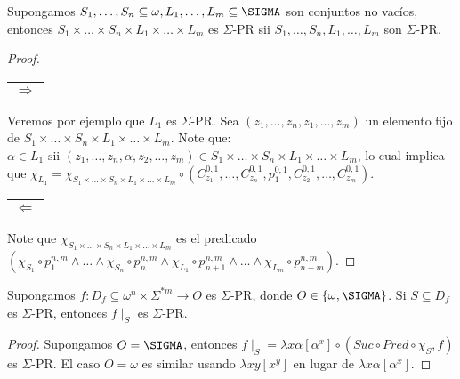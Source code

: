   \begin{lemma}
    \par Supongamos $S_{1}, \dotsc, S_{n} \subseteq \omega, L_{1}, \dotsc, L_{m} \subseteq \SIGMA$ son conjuntos no
    vacíos, entonces $S_{1} \times \dotsc \times S_{n} \times L_{1} \times \dotsc \times L_{m}$ es $\Sigma$-PR sii
    $S_{1}, \dotsc, S_{n}, L_{1}, \dotsc, L_{m}$ son $\Sigma$-PR.
  \end{lemma}
  \begin{proof}
    \begin{tabular}{|c|} \hline $\Rightarrow$\\\hline \end{tabular} Veremos por ejemplo que $L_{1}$ es $\Sigma$-PR. Sea
      $(z_{1}, \dotsc, z_{n}, z_{1}, \dotsc, z_{m})$ un elemento fijo de $S_{1} \times \dotsc \times S_{n}
      \times L_{1} \times \dotsc \times L_{m}$. Note que: $\alpha \in L_{1} \text{ sii } (z_{1}, \dotsc, z_{n}, \alpha,
      z_{2}, \dotsc, z_{m}) \in S_{1} \times \dotsc \times S_{n} \times L_{1} \times \dotsc \times L_{m}$,
      lo cual implica que $\chi_{L_{1}} = \chi_{S_{1} \times \dotsc \times S_{n} \times L_{1} \times \dotsc \times
      L_{m}} \circ (C_{z_{1}}^{0, 1}, \dotsc, C_{z_{n}}^{0, 1}, p_{1}^{0, 1}, C_{z_{2}}^{0, 1}, \dotsc,
      C_{z_{m}}^{0, 1})$.

    \begin{tabular}{|c|} \hline $\Leftarrow$\\\hline \end{tabular} Note que $\chi_{S_{1} \times \dotsc \times S_{n}
      \times L_{1} \times \dotsc \times L_{m}}$ es el predicado $(\chi_{S_{1}} \circ p_{1}^{n, m} \wedge \dotsc \wedge
      \chi_{S_{n}} \circ p_{n}^{n, m} \wedge \chi_{L_{1}} \circ p_{n+1}^{n, m} \wedge \dotsc \wedge \chi_{L_{m}} \circ
      p_{n+m}^{n, m})$.
  \end{proof}

  \begin{lemma}
    \par Supongamos $f: D_{f} \subseteq \omega^{n} \times \Sigma^{\ast m} \rightarrow O$ es $\Sigma$-PR, donde $O \in
    \{\omega, \SIGMA\}$. Si $S \subseteq D_{f}$ es $\Sigma$-PR, entonces $f \mid_{S}$ es $\Sigma$-PR.
  \end{lemma}
  \begin{proof}
    \par Supongamos $O = \SIGMA$, entonces $f \mid_{S} = \lambda x \alpha \left[\alpha^{x}\right] \circ (Suc \circ Pred
    \circ \chi_{S}, f)$ es $\Sigma$-PR. El caso $O = \omega$ es similar usando $\lambda xy \left[x^{y}\right]$ en lugar
    de $\lambda x \alpha \left[\alpha^{x}\right]$.
  \end{proof}

